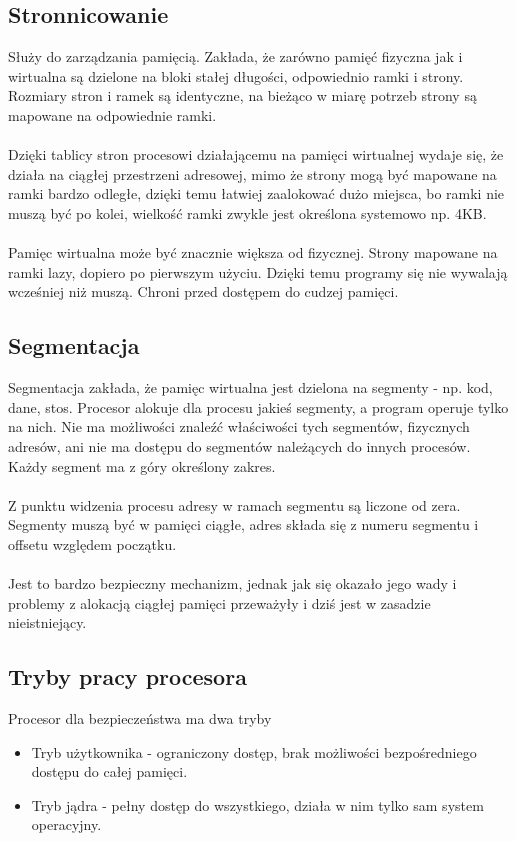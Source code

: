 \subsection{Stronnicowanie}
Służy do zarządzania pamięcią. Zakłada, że zarówno pamięć fizyczna jak i wirtualna są dzielone na bloki stałej długości, odpowiednio ramki i strony. Rozmiary stron i ramek są identyczne, na bieżąco w miarę potrzeb strony są mapowane na odpowiednie ramki. \\\\
Dzięki tablicy stron procesowi działającemu na pamięci wirtualnej wydaje się, że działa na ciągłej przestrzeni adresowej, mimo że strony mogą być mapowane na ramki bardzo odległe, dzięki temu łatwiej zaalokować dużo miejsca, bo ramki nie muszą być po kolei, wielkość ramki zwykle jest określona systemowo np. 4KB. \\\\
Pamięc wirtualna może być znacznie większa od fizycznej.  Strony mapowane na ramki lazy, dopiero po pierwszym użyciu. Dzięki temu programy się nie wywalają wcześniej niż muszą. Chroni przed dostępem do cudzej pamięci. 
\subsection{Segmentacja}
Segmentacja zakłada, że pamięc wirtualna jest dzielona na segmenty - np. kod, dane, stos. Procesor alokuje dla procesu jakieś segmenty, a program operuje tylko na nich. Nie ma możliwości znaleźć właściwości tych segmentów, fizycznych adresów, ani nie ma dostępu do segmentów należących do innych procesów. Każdy segment ma z góry określony zakres.
\\\\Z punktu widzenia procesu adresy w ramach segmentu są liczone od zera. Segmenty muszą być w pamięci ciągłe, adres składa się z numeru segmentu i offsetu względem początku. 
\\\\
Jest to bardzo bezpieczny mechanizm, jednak jak się okazało jego wady i problemy z alokacją ciągłej pamięci przeważyły i dziś jest w zasadzie nieistniejący. \subsection{Tryby pracy procesora}
Procesor dla bezpieczeństwa ma dwa tryby 
\begin{itemize}
  \item Tryb użytkownika - ograniczony dostęp, brak możliwości bezpośredniego dostępu do całej pamięci. 
  \item Tryb jądra - pełny dostęp do wszystkiego, działa w nim tylko sam system operacyjny. 
\end{itemize}
